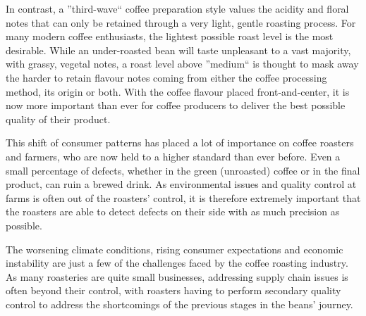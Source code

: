 In contrast, a ''third-wave`` coffee preparation style values the acidity and floral
notes that can only be retained through a very light, gentle roasting process.
For
many modern coffee enthusiasts, the lightest possible roast level is the most
desirable.
While an under-roasted bean will taste unpleasant to a vast majority,
with grassy, vegetal notes, a roast level above ''medium`` is thought to mask
away the harder to retain flavour notes coming from either the coffee processing
method, its origin or both.
With the coffee flavour
placed front-and-center, it is now more important than ever for coffee producers
to deliver the best possible quality of their product.

This shift of consumer patterns has placed a lot of importance on coffee
roasters and farmers, who are now held to a higher standard than ever before.
Even a small percentage of defects, whether in the green (unroasted) coffee or in
the final product, can ruin a brewed drink.
As environmental issues and quality control
at farms is often out of the roasters' control, it is therefore extremely important
that the roasters are able to detect defects on their side with as much precision
as possible.

%
The worsening climate conditions,
rising consumer expectations and economic instability are just a few of the
challenges faced by the coffee roasting industry.
As many roasteries are quite small
businesses, addressing supply chain issues is often beyond their control, with roasters
having to perform secondary quality control to address the shortcomings of the previous
stages in the beans' journey.

